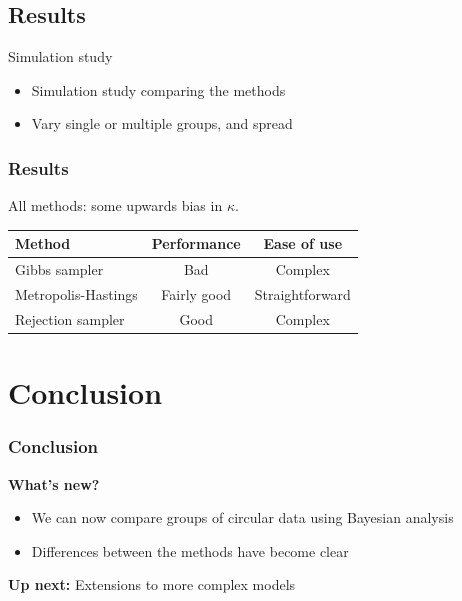 \documentclass{beamer}
\begin{document}
\subsection{Results}

\begin{frame}{Simulation study}
\begin{itemize}
\item Simulation study comparing the methods
\item Vary single or multiple groups, and spread
\end{itemize}
\end{frame}


\begin{frame}
\frametitle{Results}

All methods: some upwards bias in $\kappa$.

\begin{table}
\begin{tabular}{lcc}
\textbf{Method} & \textbf{Performance} & \textbf{Ease of use} \\\hline
Gibbs sampler & Bad & Complex \\
Metropolis-Hastings  & Fairly good & Straightforward \\
Rejection sampler & Good & Complex \\
\end{tabular}
\end{table}
\end{frame}


%
%

\section{Conclusion}

\begin{frame}
\frametitle{Conclusion}

\textbf{What's new?}
\begin{itemize}
\item We can now compare groups of circular data using Bayesian analysis \pause
\item Differences between the methods have become clear \pause
\end{itemize}
\vspace{0.3cm}
\textbf{Up next:} Extensions to more complex models

\end{frame}
\end{document}
